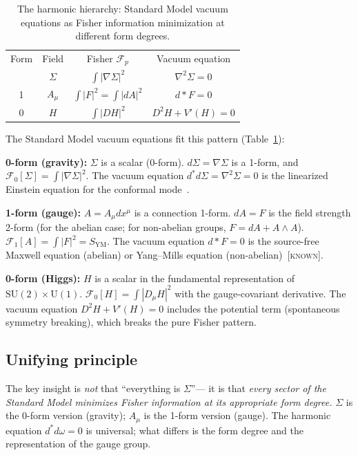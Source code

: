 \documentclass[prd,twocolumn,superscriptaddress,longbibliography]{revtex4-2}
\newcommand{\SYM}{S_{\mathrm{YM}}}
\newcommand{\known}{\textsc{[known]}}
\begin{document}
\begin{table}[t]
\centering
\caption{The harmonic hierarchy: Standard Model vacuum equations
as Fisher information minimization at different form degrees.}
\label{tab:harmonic}
\begin{ruledtabular}
\begin{tabular}{cccc}
Form & Field & Fisher $\mathcal{F}_p$ & Vacuum equation \\
\colrule
0 & $\Sigma$ & $\int|\nabla\Sigma|^2$
  & $\nabla^2\Sigma = 0$ \\[4pt]
1 & $A_\mu$ & $\int|F|^2 = \int|dA|^2$
  & $d{*}F = 0$ \\[4pt]
0 & $H$ & $\int|DH|^2$
  & $D^2 H + V'(H) = 0$ \\[2pt]
\end{tabular}
\end{ruledtabular}
\end{table}

The Standard Model vacuum equations fit this pattern
(Table~\ref{tab:harmonic}):

\smallskip
\noindent\textbf{0-form (gravity):}
$\Sigma$ is a scalar (0-form).
$d\Sigma = \nabla\Sigma$ is a 1-form, and
$\mathcal{F}_0[\Sigma] = \int|\nabla\Sigma|^2$.
The vacuum equation $d^*d\Sigma = \nabla^2\Sigma = 0$
is the linearized Einstein equation for the conformal
mode~\cite{PaperII}.

\smallskip
\noindent\textbf{1-form (gauge):}
$A = A_\mu dx^\mu$ is a connection 1-form.
$dA = F$ is the field strength 2-form (for the abelian case;
for non-abelian groups, $F = dA + A\wedge A$).
$\mathcal{F}_1[A] = \int|F|^2 = \SYM$.
The vacuum equation $d{*}F = 0$ is the source-free
Maxwell equation (abelian) or Yang--Mills equation
(non-abelian)~\known.

\smallskip
\noindent\textbf{0-form (Higgs):}
$H$ is a scalar in the fundamental representation of
$\mathrm{SU}(2)\times\mathrm{U}(1)$.
$\mathcal{F}_0[H] = \int|D_\mu H|^2$ with the gauge-covariant
derivative.
The vacuum equation $D^2H + V'(H) = 0$ includes the
potential term (spontaneous symmetry breaking), which
breaks the pure Fisher pattern.

\subsection{Unifying principle}

The key insight is \emph{not} that ``everything is $\Sigma$''---
it is that \emph{every sector of the Standard Model minimizes
Fisher information at its appropriate form degree.}
$\Sigma$ is the 0-form version (gravity); $A_\mu$ is the
1-form version (gauge).
The harmonic equation $d^*d\omega = 0$ is universal; what
differs is the form degree and the representation of the
gauge group.
\end{document}
